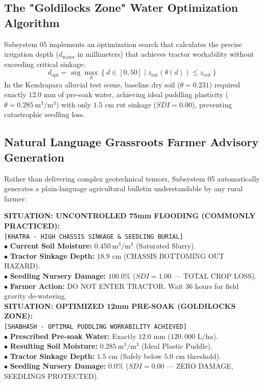 \documentclass[11pt,a4paper]{article}
\theoremstyle{definition}
\theoremstyle{remark}
\begin{document}
\subsection{The "Goldilocks Zone" Water Optimization Algorithm}
Subsystem 05 implements an optimization search that calculates the precise irrigation depth ($d_{\text{water}}$ in millimeters) that achieves tractor workability without exceeding critical sinkage:
\begin{equation}
    d_{\text{opt}} = \arg \max_{d} \left\{ d \in [0, 50] \mid z_{\text{rut}}(\theta(d)) \le z_{\text{crit}} \right\}
\end{equation}
In the Kendrapara alluvial test scene, baseline dry soil ($\theta = 0.231$) required exactly $12.0\text{ mm}$ of pre-soak water, achieving ideal puddling plasticity ($\theta = 0.285~\text{m}^3/\text{m}^3$) with only $1.5\text{ cm}$ rut sinkage ($SDI = 0.00$), preventing catastrophic seedling loss.

\subsection{Natural Language Grassroots Farmer Advisory Generation}
Rather than delivering complex geotechnical tensors, Subsystem 05 automatically generates a plain-language agricultural bulletin understandable by any rural farmer:
\begin{tcolorbox}[colback=yellow!10,colframe=orange!80!black,title=\textbf{JCC RURAL ADVISORY: PADDY NURSERY TILLING & RUT SINKAGE BULLETIN}]
\textbf{SITUATION: UNCONTROLLED 75mm FLOODING (COMMONLY PRACTICED):}\\
\texttt{[KHATRA - HIGH CHASSIS SINKAGE & SEEDLING BURIAL]}\\
$\bullet$ \textbf{Current Soil Moisture:} $0.450~\text{m}^3/\text{m}^3$ (Saturated Slurry).\\
$\bullet$ \textbf{Tractor Sinkage Depth:} $18.9\text{ cm}$ (CHASSIS BOTTOMING OUT HAZARD).\\
$\bullet$ \textbf{Seedling Nursery Damage:} $100.0\%$ ($SDI = 1.00$ --- TOTAL CROP LOSS).\\
$\bullet$ \textbf{Farmer Action:} DO NOT ENTER TRACTOR. Wait 36 hours for field gravity de-watering.\\

\textbf{SITUATION: OPTIMIZED 12mm PRE-SOAK (GOLDILOCKS ZONE):}\\
\texttt{[SHABHASH - OPTIMAL PUDDLING WORKABILITY ACHIEVED]}\\
$\bullet$ \textbf{Prescribed Pre-soak Water:} Exactly $12.0\text{ mm}$ ($120,000\text{ L/ha}$).\\
$\bullet$ \textbf{Resulting Soil Moisture:} $0.285~\text{m}^3/\text{m}^3$ (Ideal Plastic Puddle).\\
$\bullet$ \textbf{Tractor Sinkage Depth:} $1.5\text{ cm}$ (Safely below $5.0\text{ cm}$ threshold).\\
$\bullet$ \textbf{Seedling Nursery Damage:} $0.0\%$ ($SDI = 0.00$ --- ZERO DAMAGE, SEEDLINGS PROTECTED).
\end{tcolorbox}
\end{document}
